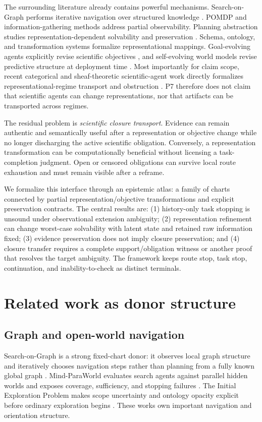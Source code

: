 \documentclass[11pt]{article}
\begin{document}
The surrounding literature already contains powerful mechanisms. Search-on-Graph performs iterative navigation over structured knowledge \cite{sog2025}. POMDP and information-gathering methods address partial observability. Planning abstraction studies representation-dependent solvability and preservation \cite{banihashemi2017,dong2025}. Schema, ontology, and transformation systems formalize representational mappings. Goal-evolving agents explicitly revise scientific objectives \cite{saga2025}, and self-evolving world models revise predictive structure at deployment time \cite{sewm2026}. Most importantly for claim scope, recent categorical and sheaf-theoretic scientific-agent work directly formalizes representational-regime transport and obstruction \cite{categorical2026,sheaf2026}. P7 therefore does not claim that scientific agents can change representations, nor that artifacts can be transported across regimes.

The residual problem is \emph{scientific closure transport}. Evidence can remain authentic and semantically useful after a representation or objective change while no longer discharging the active scientific obligation. Conversely, a representation transformation can be computationally beneficial without licensing a task-completion judgment. Open or censored obligations can survive local route exhaustion and must remain visible after a reframe.

We formalize this interface through an epistemic atlas: a family of charts connected by partial representation/objective transformations and explicit preservation contracts. The central results are: (1) history-only task stopping is unsound under observational extension ambiguity; (2) representation refinement can change worst-case solvability with latent state and retained raw information fixed; (3) evidence preservation does not imply closure preservation; and (4) closure transfer requires a complete support/obligation witness or another proof that resolves the target ambiguity. The framework keeps route stop, task stop, continuation, and inability-to-check as distinct terminals.

\section{Related work as donor structure}
\subsection{Graph and open-world navigation}
Search-on-Graph is a strong fixed-chart donor: it observes local graph structure and iteratively chooses navigation steps rather than planning from a fully known global graph \cite{sog2025}. Mind-ParaWorld evaluates search agents against parallel hidden worlds and exposes coverage, sufficiency, and stopping failures \cite{mpw2026}. The Initial Exploration Problem makes scope uncertainty and ontology opacity explicit before ordinary exploration begins \cite{iep2026}. These works own important navigation and orientation structure.
\end{document}
